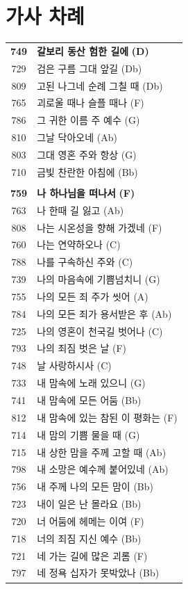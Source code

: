 \section*{가사 차례}
\begin{supertabular}{c l}
\textbf{749} & \textbf{갈보리 동산 험한 길에} \textbf{(D)} \\
729 & 검은 구름 그대 앞길 (Db) \\
809 & 고된 나그네 순례 그칠 때 (Db) \\
765 & 괴로울 때나 슬플 때나 (F) \\
786 & 그 귀한 이름 주 예수 (G) \\
810 & 그날 닥아오네 (Ab) \\
803 & 그대 영혼 주와 항상 (G) \\
710 & 금빛 찬란한 아침에 (Bb) \\
 & \\
\textbf{759} & \textbf{나 하나님을 떠나서} \textbf{(F)} \\
763 & 나 한때 길 잃고 (Ab) \\
808 & 나는 시온성을 향해 가겠네 (F) \\
760 & 나는 연약하오나 (C) \\
788 & 나를 구속하신 주와 (C) \\
739 & 나의 마음속에 기쁨넘치니 (G) \\
755 & 나의 모든 죄 주가 씻어 (A) \\
784 & 나의 모든 죄가 용서받은 후 (Ab) \\
725 & 나의 영혼이 천국길 벗어나 (C) \\
793 & 나의 죄짐 벗은 날 (F) \\
748 & 날 사랑하시사 (C) \\
733 & 내 맘속에 노래 있으니 (G) \\
741 & 내 맘속에 모든 어둠 (Bb) \\
812 & 내 맘속에 있는 참된 이 평화는 (F) \\
714 & 내 맘의 기쁨 물을 때 (G) \\
715 & 내 상한 맘을 주께 고할 때 (Ab) \\
798 & 내 소망은 예수께 붙어있네 (Ab) \\
756 & 내 주께 나의 모든 맘이 (Bb) \\
723 & 내이 일은 난 몰라요 (Bb) \\
720 & 너 어둠에 헤메는 이여 (F) \\
718 & 너의 죄짐 지신 예수 (Bb) \\
721 & 네 가는 길에 많은 괴롬 (F) \\
797 & 네 정욕 십자가 못박았나 (Bb) \\

\end{supertabular}

